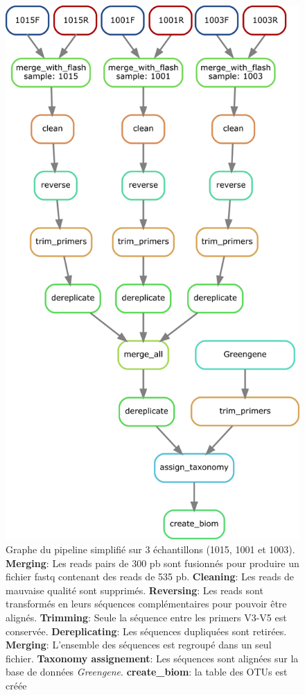 \documentclass[12pt,a4paper]{article}
\begin{document}
\begin{figure}[!ht]
\begin{center}
\includegraphics[scale=0.5]{img/pipeline_trio.png}\hfill
\end{center}
\caption{Graphe du pipeline simplifié sur 3 échantillons (1015, 1001 et 1003).\\ \textbf{Merging}: Les reads pairs de 300 pb sont fusionnés  pour produire un fichier fastq contenant des reads de 535 pb. \textbf{Cleaning}: Les reads de mauvaise qualité sont supprimés. \textbf{Reversing}: Les reads sont transformés en leurs séquences complémentaires pour pouvoir être alignés. \textbf{Trimming}: Seule la séquence entre les primers V3-V5 est conservée. \textbf{Dereplicating}: Les séquences dupliquées sont retirées. \textbf{Merging}: L'ensemble des séquences est regroupé dans un seul fichier. \textbf{Taxonomy assignement}: Les séquences sont alignées sur la base de données \textit{Greengene}. \textbf{create\_biom}: la table des OTUs est créée }
\label{pipeline_trio}
\end{figure}
\end{document}
